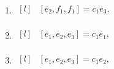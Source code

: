 \begin{adjustwidth*}{-0.5cm}{0cm}
\begin{multicols*}{2}
\begin{enumerate}
    \item $\begin{matrix*}[l]
            & [e_2, f_1, f_1] =  c_{1} e_3, \\
        \end{matrix*}$

    \item $\begin{matrix*}[l]
            & [e_1, e_2, e_3] = c_{1} e_1  , \\
        \end{matrix*}$

    \item $\begin{matrix*}[l]
            & [e_1, e_2, e_3] =  c_{1} e_2 , \\
        \end{matrix*}$
\end{enumerate}
\end{multicols*}
\end{adjustwidth*}


